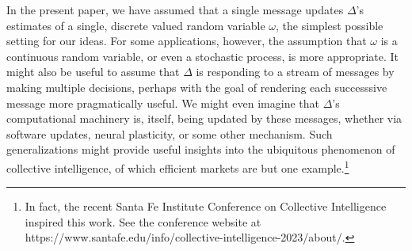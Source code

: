 \documentclass[11pt]{article}
\begin{document}
In the present paper, we have assumed that a single message updates $\Delta$'s estimates of a single, discrete valued random variable $\omega$, the simplest possible setting for our ideas.  For some applications,
however, the assumption that $\omega$ is a continuous random variable, or even a stochastic process, is more appropriate.  It might also be useful to assume that $\Delta$ is responding to a stream of messages by making multiple decisions, perhaps with the goal of rendering each successsive message more pragmatically useful.  We might even imagine that
$\Delta$'s computational machinery is, itself, being updated by these messages, whether via software updates, neural plasticity, 
or some other mechanism.  Such generalizations might provide useful insights into the ubiquitous phenomenon
of collective intelligence,  of which efficient markets are but one example.\footnote{In fact, the recent Santa Fe Institute Conference on Collective Intelligence inspired this work.  See the conference website at
https://www.santafe.edu/info/collective-intelligence-2023/about/.}
\end{document}
